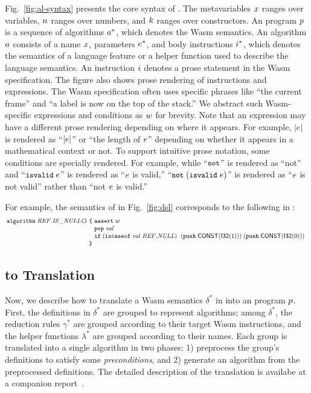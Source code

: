 Fig.~\ref{fig:al-syntax} presents the core syntax of \al.
The metavariables $x$ ranges over variables,
$n$ ranges over numbers, and
$k$ ranges over constructors.
An \al program $p$ is a sequence of algorithms $a^*$,
which denotes the Wasm semantics.
An algorithm $a$ consists of a name $x$, parameters $e^*$,
and body instructions $i^*$, which denotes the semantics of a
language feature or a helper function used to describe the language semantics.
An instruction $i$ denotes a prose statement in the Wasm specification.
The figure also shows prose rendering of instructions and expressions.
The Wasm specification often uses specific phrases like ``the current frame'' and 
``a label is now on the top of the stack.''
We abstract such Wasm-specific expressions and conditions as $w$ for brevity.
Note that an \al expression may have a different prose rendering
depending on where it appears. For example, $|e|$ is rendered as 
``$|e|$'' or ``the length of $e$'' depending on whether it appears in
a mathematical context or not.
To support intuitive prose notation, some \al conditions are specially rendered.
For example, while ``$\texttt{\small not}$'' is rendered as ``not'' and ``$\texttt{\small isvalid}\;e$''
is rendered as ``$e$ is valid,''
``$\texttt{\small not} \; (\texttt{\small isvalid} \; e)$'' is rendered as ``$e$ is not valid''
rather than ``not $e$ is valid.''

For example, the semantics of 
in Fig.~\ref{fig:dsl} corresponds to the following in \al:
\[
\small
\!\!
\begin{array}{r@{~}l}
\kwalg \; \mathit{REF.IS\_NULL} \kwrl \kwrr \; \kwcl &
  \kwassert \; \wasmc \\
& \kwpop \; \mathit{val}\\
& \kwif \; (\kwiscaseof \; \mathit{val} \; \mathit{REF.NULL})\;
\; (\kwpush \; \ssf{CONST}(\ssf{I32}(1))) \; (\kwpush \; \ssf{CONST}(\ssf{I32}(0)))\\
\kwcr
\end{array}
\]

\subsection{\dl to \al Translation}\label{sec:dl2al}
Now, we describe how to translate a Wasm semantics $\delta^*$ in \dl into an \al program $p$.
First, the definitions in $\delta^*$ are grouped to represent algorithms; among $\delta^*$,
the reduction rules $\gamma^*$ are grouped according to their target Wasm instructions, and
the helper functions $\lambda^*$ are grouped according to their names.
Each group is translated into a single algorithm in two phases:
1) preprocess the group's definitions to satisfy some \textit{preconditions}, and
2) generate an \al algorithm from the preprocessed \dl definitions.
The detailed description of the translation is availabe at a companion report~\cite{il-tr}.

